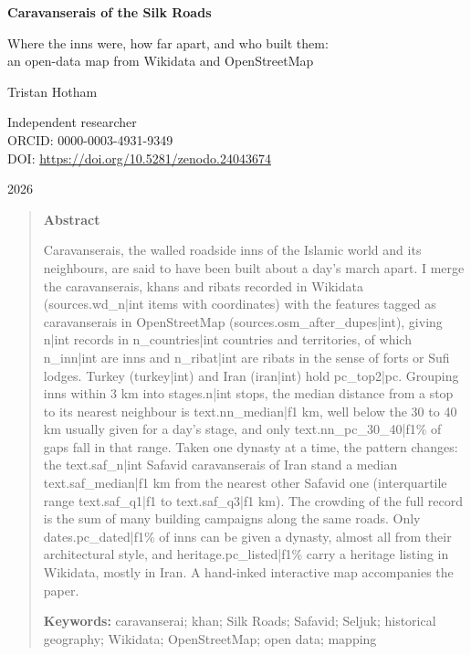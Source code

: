 \documentclass[11pt,a4paper]{article}
\begin{document}
\begin{center}
{\Large\bfseries Caravanserais of the Silk Roads\par}
\vspace{0.4em}
{\large Where the inns were, how far apart, and who built them:\\an open-data map from Wikidata and OpenStreetMap\par}
\vspace{1.2em}
{\large Tristan Hotham\par}
\vspace{0.3em}
{\small Independent researcher\\
ORCID: 0000-0003-4931-9349\\
DOI: \href{https://doi.org/10.5281/zenodo.24043674}{https://doi.org/10.5281/zenodo.24043674}\par}
\vspace{0.8em}
2026
\end{center}

\begin{quote}
\small
\begin{center}\textbf{Abstract}\end{center}
Caravanserais, the walled roadside inns of the Islamic world and its neighbours, are said to have been built about a day's march apart. I merge the caravanserais, khans and ribats recorded in Wikidata ({{sources.wd_n|int}} items with coordinates) with the features tagged as caravanserais in OpenStreetMap ({{sources.osm_after_dupes|int}}), giving {{n|int}} records in {{n_countries|int}} countries and territories, of which {{n_inn|int}} are inns and {{n_ribat|int}} are ribats in the sense of forts or Sufi lodges. Turkey ({{turkey|int}}) and Iran ({{iran|int}}) hold {{pc_top2|pc}}. Grouping inns within 3 km into {{stages.n|int}} stops, the median distance from a stop to its nearest neighbour is {{text.nn_median|f1}} km, well below the 30 to 40 km usually given for a day's stage, and only {{text.nn_pc_30_40|f1}}\% of gaps fall in that range. Taken one dynasty at a time, the pattern changes: the {{text.saf_n|int}} Safavid caravanserais of Iran stand a median {{text.saf_median|f1}} km from the nearest other Safavid one (interquartile range {{text.saf_q1|f1}} to {{text.saf_q3|f1}} km). The crowding of the full record is the sum of many building campaigns along the same roads. Only {{dates.pc_dated|f1}}\% of inns can be given a dynasty, almost all from their architectural style, and {{heritage.pc_listed|f1}}\% carry a heritage listing in Wikidata, mostly in Iran. A hand-inked interactive map accompanies the paper.

\textbf{Keywords:} caravanserai; khan; Silk Roads; Safavid; Seljuk; historical geography; Wikidata; OpenStreetMap; open data; mapping
\end{quote}
\end{document}
